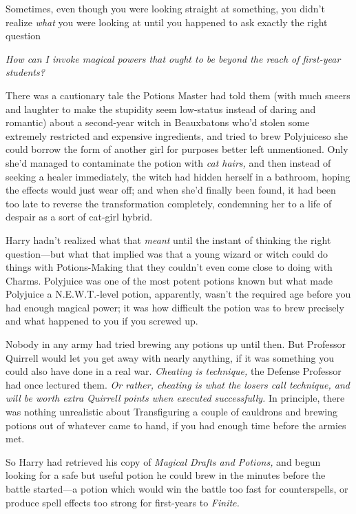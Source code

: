 Sometimes, even though you were looking straight at something, you didn't
realize \emph{what} you were looking at until you happened to ask exactly the
right question{\el}

\emph{How can I invoke magical powers that ought to be beyond the reach of
first-year students?}

There was a cautionary tale the Potions Master had told them (with much sneers
and laughter to make the stupidity seem low-status instead of daring and
romantic) about a second-year witch in Beauxbatons who'd stolen some extremely
restricted and expensive ingredients, and tried to brew Polyjuiceso she could
borrow the form of another girl for purposes better left unmentioned. Only
she'd managed to contaminate the potion with \emph{cat hairs,} and then instead
of seeking a healer immediately, the witch had hidden herself in a bathroom,
hoping the effects would just wear off; and when she'd finally been found, it
had been too late to reverse the transformation completely, condemning her to a
life of despair as a sort of cat-girl hybrid.

Harry hadn't realized what that \emph{meant} until the instant of thinking the
right question—but what that implied was that a young wizard or witch could
do things with Potions-Making that they couldn't even come close to doing with
Charms. Polyjuice was one of the most potent potions known{\el} but what
made Polyjuice a N.E.W.T.-level potion, apparently, wasn't the required age
before you had enough magical power; it was how difficult the potion was to
brew precisely and what happened to you if you screwed up.

Nobody in any army had tried brewing any potions up until then. But Professor
Quirrell would let you get away with nearly anything, if it was something you
could also have done in a real war. \emph{Cheating is technique,} the Defense
Professor had once lectured them. \emph{Or rather, cheating is what the losers
call technique, and will be worth extra Quirrell points when executed
successfully.} In principle, there was nothing unrealistic about Transfiguring
a couple of cauldrons and brewing potions out of whatever came to hand, if you
had enough time before the armies met.

So Harry had retrieved his copy of \emph{Magical Drafts and Potions,} and begun
looking for a safe but useful potion he could brew in the minutes before the
battle started—a potion which would win the battle too fast for
counterspells, or produce spell effects too strong for first-years to
\emph{Finite.}

